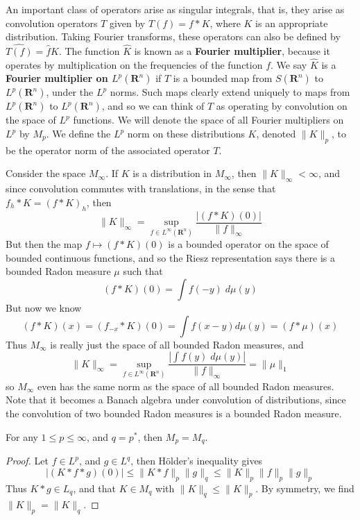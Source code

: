 An important class of operators arise as singular integrals, that is, they arise as convolution operators $T$ given by $T(f) = f * K$, where $K$ is an appropriate distribution. Taking Fourier transforms, these operators can also be defined by $\widehat{T(f)} = \widehat{f} \widehat{K}$. The function $\widehat{K}$ is known as a {\bf Fourier multiplier}, because it operates by multiplication on the frequencies of the function $f$. We say $\widehat{K}$ is a {\bf Fourier multiplier on $L^p(\mathbf{R}^n)$} if $T$ is a bounded map from $S(\mathbf{R}^n)$ to $L^p(\mathbf{R}^n)$, under the $L^p$ norms. Such maps clearly extend uniquely to maps from $L^p(\mathbf{R}^n)$ to $L^p(\mathbf{R}^n)$, and so we can think of $T$ as operating by convolution on the space of $L^p$ functions. We will denote the space of all Fourier multipliers on $L^p$ by $M_p$. We define the $L^p$ norm on these distributions $K$, denoted $\| K \|_p$, to be the operator norm of the associated operator $T$.

\begin{example}
	Consider the space $M_\infty$. If $K$ is a distribution in $M_\infty$, then $\| K \|_\infty < \infty$, and since convolution commutes with translations, in the sense that $f_h * K = (f * K)_h$, then
	\[ \| K \|_\infty = \sup_{f \in L^\infty(\mathbf{R}^n)} \frac{|(f * K)(0)|}{\| f \|_\infty} \]
	But then the map $f \mapsto (f * K)(0)$ is a bounded operator on the space of bounded continuous functions, and so the Riesz representation says there is a bounded Radon measure $\mu$ such that
	\[ (f * K)(0) = \int f(-y)\; d\mu(y) \]
	But now we know
	\[ (f * K)(x) = (f_{-x} * K)(0) = \int f(x - y) d\mu(y) = (f * \mu)(x) \]
	Thus $M_\infty$ is really just the space of all bounded Radon measures, and
	\[ \| K \|_\infty = \sup_{f \in L^\infty(\mathbf{R}^n)} \frac{\left| \int f(y)\; d\mu(y) \right|}{\| f \|_\infty} = \| \mu \|_1 \]
	so $M_\infty$ even has the same norm as the space of all bounded Radon measures. Note that it becomes a Banach algebra under convolution of distributions, since the convolution of two bounded Radon measures is a bounded Radon measure.
\end{example}

\begin{theorem}
	For any $1 \leq p \leq \infty$, and $q = p^*$, then $M_p = M_q$.
\end{theorem}
\begin{proof}
	Let $f \in L^p$, and $g \in L^q$, then H\"{o}lder's inequality gives
	\[ |(K * f * g)(0)| \leq \| K * f \|_p \| g \|_q \leq \| K \|_p \| f \|_p \| g \|_p \]
	Thus $K * g \in L_q$, and that $K \in M_q$ with $\| K \|_q \leq \| K \|_p$. By symmetry, we find $\| K \|_p = \| K \|_q$.
\end{proof}

